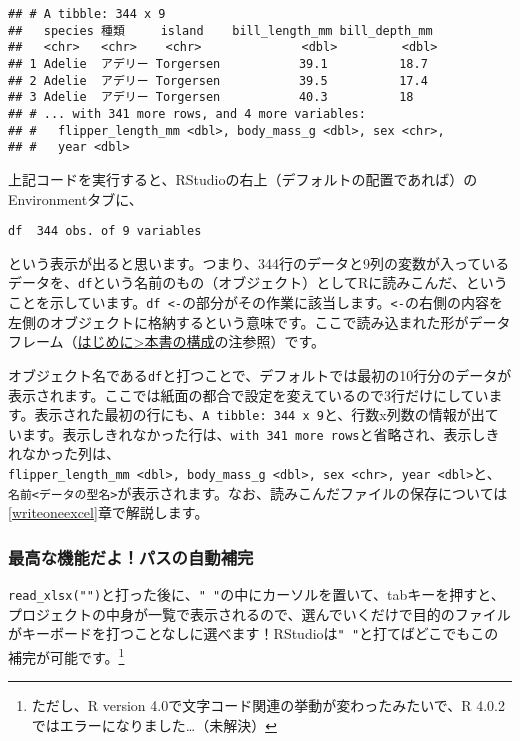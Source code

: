 \documentclass[
  xelatex,ja=standard, b5paper]{bxjsbook}
\begin{document}
\begin{verbatim}
## # A tibble: 344 x 9
##   species 種類     island    bill_length_mm bill_depth_mm
##   <chr>   <chr>    <chr>              <dbl>         <dbl>
## 1 Adelie  アデリー Torgersen           39.1          18.7
## 2 Adelie  アデリー Torgersen           39.5          17.4
## 3 Adelie  アデリー Torgersen           40.3          18  
## # ... with 341 more rows, and 4 more variables:
## #   flipper_length_mm <dbl>, body_mass_g <dbl>, sex <chr>,
## #   year <dbl>
\end{verbatim}

上記コードを実行すると、RStudioの右上（デフォルトの配置であれば）のEnvironmentタブに、

\begin{verbatim}
df  344 obs. of 9 variables
\end{verbatim}

という表示が出ると思います。つまり、344行のデータと9列の変数が入っているデータを、\texttt{df}という名前のもの（オブジェクト）としてRに読みこんだ、ということを示しています。\texttt{df\ \textless{}-}の部分がその作業に該当します。\texttt{\textless{}-}の右側の内容を左側のオブジェクトに格納するという意味です。ここで読み込まれた形がデータフレーム（\protect\hyperlink{structure}{はじめに\textgreater 本書の構成}の注参照）です。

オブジェクト名である\texttt{df}と打つことで、デフォルトでは最初の10行分のデータが表示されます。ここでは紙面の都合で設定を変えているので3行だけにしています。表示された最初の行にも、\texttt{A\ tibble:\ 344\ x\ 9}と、行数x列数の情報が出ています。表示しきれなかった行は、\texttt{with\ 341\ more\ rows}と省略され、表示しきれなかった列は、\texttt{flipper\_length\_mm\ \textless{}dbl\textgreater{},\ body\_mass\_g\ \textless{}dbl\textgreater{},\ sex\ \textless{}chr\textgreater{},\ year\ \textless{}dbl\textgreater{}}と、\texttt{名前\textless{}データの型名\textgreater{}}が表示されます。なお、読みこんだファイルの保存については\ref{writeoneexcel}章で解説します。

\hypertarget{hokan}{%
\subsubsection{最高な機能だよ！パスの自動補完}\label{hokan}}

\texttt{read\_xlsx("")}と打った後に、\texttt{"\ "}の中にカーソルを置いて、tabキーを押すと、プロジェクトの中身が一覧で表示されるので、選んでいくだけで目的のファイルがキーボードを打つことなしに選べます！RStudioは\texttt{"\ "}と打てばどこでもこの補完が可能です。\footnote{ただし、R version 4.0で文字コード関連の挙動が変わったみたいで、R 4.0.2ではエラーになりました\ldots（未解決）}
\end{document}
